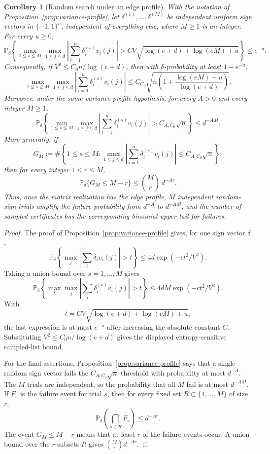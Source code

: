 \documentclass[11pt]{amsart}
\numberwithin{equation}{section}
\newtheorem{corollary}[theorem]{Corollary}
\theoremstyle{definition}
\theoremstyle{remark}
\newcommand{\Prob}{\mathbb P}
\begin{document}
\begin{corollary}[Random search under an edge profile]
\label{cor:edge-profile-random-search}
With the notation of Proposition~\ref{prop:variance-profile}, let
\(\delta^{(1)},\ldots,\delta^{(M)}\) be independent uniform sign vectors in
\(\{-1,1\}^n\), independent of everything else, where \(M\ge1\) is an integer.
For every \(u\ge0\),
\[
  \Prob_\delta\left\{
  \max_{1\le s\le M}\max_{1\le j\le d}
  \left|\sum_{i=1}^n\delta_i^{(s)}v_i(j)\right|
  >
  C V\sqrt{\log(e+d)+\log(eM)+u}
  \right\}\le e^{-u}.
\]
Consequently, if \(V^2\le C_0n/\log(e+d)\), then with \(\delta\)-probability
at least \(1-e^{-u}\),
\[
  \max_{1\le s\le M}\max_{1\le j\le d}
  \left|\sum_{i=1}^n\delta_i^{(s)}v_i(j)\right|
  \le
  C_{C_0}\sqrt{
    n\left(1+\frac{\log(eM)+u}{\log(e+d)}\right)} .
\]
Moreover, under the same variance-profile hypothesis, for every \(A>0\) and
every integer \(M\ge1\),
\[
  \Prob_\delta\left\{
  \min_{1\le s\le M}\max_{1\le j\le d}
  \left|\sum_{i=1}^n\delta_i^{(s)}v_i(j)\right|
  > C_{A,C_0}\sqrt n
  \right\}\le d^{-AM}.
\]
More generally, if
\[
  G_M:=\#\left\{1\le s\le M:
  \max_{1\le j\le d}
  \left|\sum_{i=1}^n\delta_i^{(s)}v_i(j)\right|
  \le C_{A,C_0}\sqrt n\right\},
\]
then for every integer \(1\le r\le M\),
\[
  \Prob_\delta\{G_M\le M-r\}
  \le \binom{M}{r}\,d^{-Ar}.
\]
Thus, once the matrix realization has the edge profile, \(M\) independent
random-sign trials amplify the failure probability from \(d^{-A}\) to
\(d^{-AM}\), and the number of sampled certificates has the corresponding
binomial upper tail for failures.
\end{corollary}

\begin{proof}
The proof of Proposition~\ref{prop:variance-profile} gives, for one sign vector
\(\delta\),
\[
  \Prob_\delta\left\{
  \max_j\left|\sum_i\delta_i v_i(j)\right|>t
  \right\}
  \le 4d\exp(-ct^2/V^2).
\]
Taking a union bound over \(s=1,\ldots,M\) gives
\[
  \Prob_\delta\left\{
  \max_s\max_j\left|\sum_i\delta_i^{(s)}v_i(j)\right|>t
  \right\}
  \le 4dM\exp(-ct^2/V^2).
\]
With
\[
  t=C V\sqrt{\log(e+d)+\log(eM)+u},
\]
the last expression is at most \(e^{-u}\) after increasing the absolute
constant \(C\).  Substituting \(V^2\le C_0n/\log(e+d)\) gives the displayed
entropy-sensitive sampled-list bound.

For the final assertions, Proposition~\ref{prop:variance-profile} says that a
single random sign vector fails the \(C_{A,C_0}\sqrt n\) threshold with
probability at most \(d^{-A}\).  The \(M\) trials are independent, so the
probability that all \(M\) fail is at most \(d^{-AM}\).
If \(F_s\) is the failure event for trial \(s\), then for every fixed set
\(R\subset\{1,\ldots,M\}\) of size \(r\),
\[
  \Prob_\delta\left(\bigcap_{s\in R}F_s\right)\le d^{-Ar}.
\]
The event \(G_M\le M-r\) means that at least \(r\) of the failure events occur.
A union bound over the \(r\)-subsets \(R\) gives
\(\binom{M}{r}d^{-Ar}\).
\end{proof}
\end{document}
